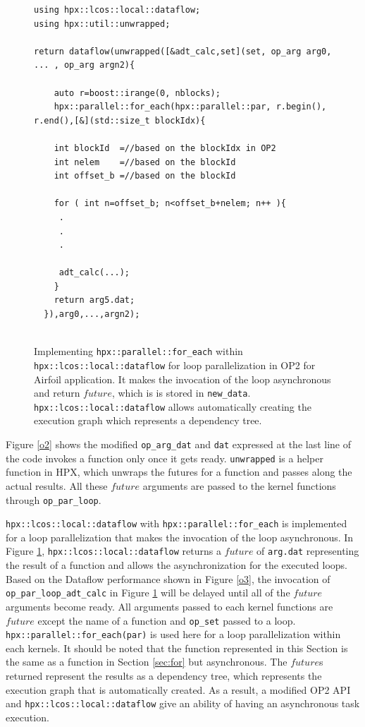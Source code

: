 \documentclass[conference]{IEEEtran}
\begin{document}
\begin{figure}
    \begin{lstlisting}    
using hpx::lcos::local::dataflow;
using hpx::util::unwrapped;    

return dataflow(unwrapped([&adt_calc,set](set, op_arg arg0, ... , op_arg argn2){

    auto r=boost::irange(0, nblocks);
    hpx::parallel::for_each(hpx::parallel::par, r.begin(), r.end(),[&](std::size_t blockIdx){
  
    int blockId  =//based on the blockIdx in OP2
    int nelem    =//based on the blockId 
    int offset_b =//based on the blockId
        
    for ( int n=offset_b; n<offset_b+nelem; n++ ){
     .
     .
     .

     adt_calc(...);
    }
    return arg5.dat;
  }),arg0,...,argn2);
  
    \end{lstlisting}
    \caption{\small{Implementing \texttt{hpx::parallel::for\_each} within \texttt{hpx::lcos::local::dataflow} for loop parallelization in OP2 for Airfoil application. It makes the invocation of the loop asynchronous and return $future$, which is is stored in \texttt{new\_data}. \texttt{hpx::lcos::local::dataflow} allows automatically creating the execution graph which represents a dependency tree.}}
    \label{l6b}
\end{figure}



Figure \ref{o2} shows the modified \texttt{op\_arg\_dat} and \texttt{dat} expressed at the last line of the code invokes a function only once it gets ready. \texttt{unwrapped} is a helper function in HPX, which unwraps the futures for a function and passes along the actual results. All these $future$ arguments are passed to the kernel functions through \texttt{op\_par\_loop}.



\texttt{hpx::lcos::local::dataflow} with \texttt{hpx::parallel::for\_each} is implemented for a loop parallelization that makes the invocation of the loop asynchronous. In Figure \ref{l6b}, \texttt{hpx::lcos::local::dataflow} returns a $future$ of \texttt{arg.dat} representing the result of a function and allows the asynchronization for the executed loops. Based on the Dataflow performance shown in Figure \ref{o3}, the invocation of \texttt{op\_par\_loop\_adt\_calc} in Figure \ref{l6b} will be delayed until all of the $future$ arguments become ready. All arguments passed to each kernel functions are $future$ except the name of a function and \texttt{op\_set} passed to a loop. \texttt{hpx::parallel::for\_each(par)} is used here for a loop parallelization within each kernels. It should be noted that the function represented in this Section is the same as a function in Section \ref{sec:for} but asynchronous. The $future$s returned represent the results as a dependency tree, which represents the execution graph that is automatically created. As a result, a modified OP2 API and \texttt{hpx::lcos::local::dataflow} give an ability of having an asynchronous task execution. 
\end{document}
